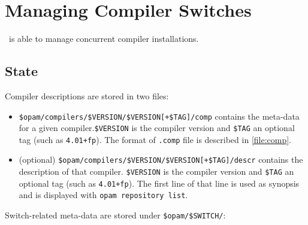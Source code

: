 \documentclass[a4paper,10pt]{article}
\begin{document}
\section{Managing Compiler Switches}
\label{section:switches}

\OPAM\ is able to manage concurrent compiler installations.

\subsection{State}

Compiler descriptions are stored in two files:

\begin{itemize}

\item \verb|$opam/compilers/$VERSION/$VERSION[+$TAG]/comp| contains the meta-data
  for a given compiler.\verb+$VERSION+ is the compiler version and
  \verb+$TAG+ an optional tag (such as \verb|4.01+fp|).
  The format of {\tt .comp} file is described in \ref{file:comp}.

\item (optional) \verb|$opam/compilers/$VERSION/$VERSION[+$TAG]/descr|
  contains the description of that compiler. \verb+$VERSION+ is the
  compiler version and \verb+$TAG+ an optional tag (such as
  \verb|4.01+fp|). The first line of that line is used as synopsis and
  is displayed with {\tt opam repository list}.

\end{itemize}

Switch-related meta-data are stored under \verb+$opam/$SWITCH/+:
\end{document}

